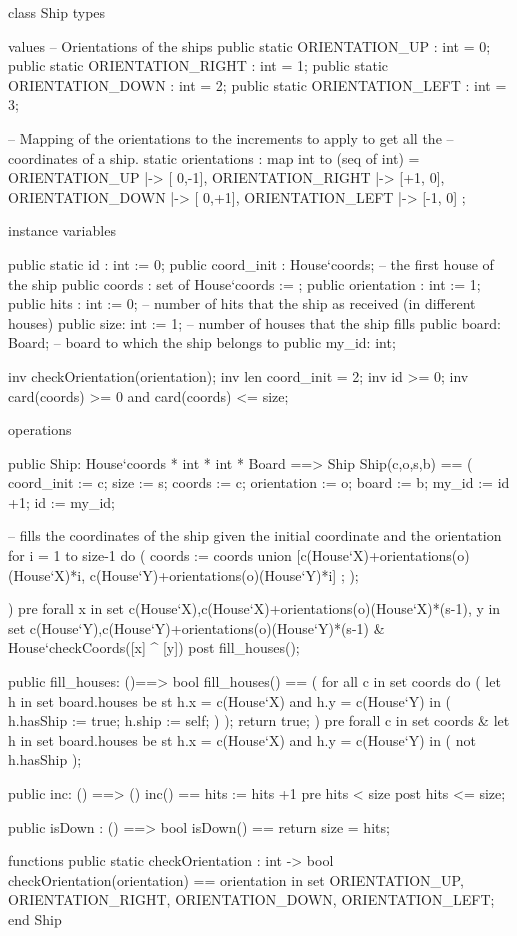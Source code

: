 \begin{vdm_al}
class Ship
 types
  
 values
  -- Orientations of the ships
  public static ORIENTATION_UP : int = 0;
  public static ORIENTATION_RIGHT : int = 1;
  public static ORIENTATION_DOWN : int = 2;
  public static ORIENTATION_LEFT : int = 3;
  
  -- Mapping of the orientations to the increments to apply to get all the
  -- coordinates of a ship.
  static orientations : map int to (seq of int) = {
   ORIENTATION_UP  |-> [ 0,-1],
   ORIENTATION_RIGHT |-> [+1, 0],
   ORIENTATION_DOWN |-> [ 0,+1],
   ORIENTATION_LEFT |-> [-1, 0]
  };

 instance variables
 
  public static id : int := 0;
  public coord_init : House`coords; -- the first house of the ship
  public coords : set of House`coords := {};
  public orientation : int := 1;
  public hits : int := 0; -- number of hits that the ship as received (in different houses) 
  public size: int := 1; -- number of houses that the ship fills
  public board: Board; -- board to which the ship belongs to
  public my_id: int;
  
  inv checkOrientation(orientation);
  inv len coord_init = 2;
  inv id >= 0;
  inv card(coords) >= 0 and card(coords) <= size;
 
 operations
 
 public Ship: House`coords * int * int * Board ==> Ship
 Ship(c,o,s,b) == 
 (
  coord_init := c;
  size := s;
  coords := {c};
  orientation := o;
  board := b;
  my_id := id +1;
  id := my_id;
  
  -- fills the coordinates of the ship given the initial coordinate and the orientation
  for i = 1 to size-1 do ( 
   coords := coords union {
      [c(House`X)+orientations(o)(House`X)*i,
        c(House`Y)+orientations(o)(House`Y)*i]
       };
  );

 )
 pre forall x in set {c(House`X),c(House`X)+orientations(o)(House`X)*(s-1)},
    y in set {c(House`Y),c(House`Y)+orientations(o)(House`Y)*(s-1)} &
   House`checkCoords([x] ^ [y])
 post fill_houses();
 
 public fill_houses: ()==> bool
  fill_houses() ==
  (
   for all c in set coords do
   (
    let h in set board.houses be st h.x = c(House`X) and 
             h.y = c(House`Y) in
    (
     h.hasShip := true;
     h.ship := self;
    )
   );
   return true;
  )
 pre forall c in set coords &
  let h in set board.houses be st h.x = c(House`X) and 
           h.y = c(House`Y) in
  (
   not h.hasShip
  );

 public inc: () ==> ()
  inc() == hits := hits +1
 pre hits < size
 post hits <= size;
 
 public isDown : () ==> bool
  isDown() == return size = hits;
  
 functions
  public static checkOrientation : int -> bool
   checkOrientation(orientation) ==
    orientation in set {ORIENTATION_UP, ORIENTATION_RIGHT, ORIENTATION_DOWN, ORIENTATION_LEFT};
end Ship
\end{vdm_al}

